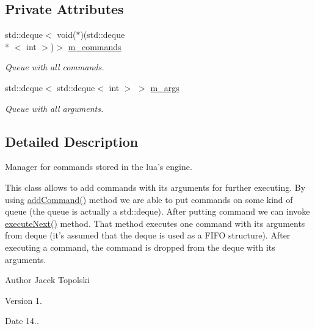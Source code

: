 \subsection*{Private Attributes}
\begin{DoxyCompactItemize}
\item 
std\-::deque$<$ void($\ast$)(std\-::deque\\*
$<$ int $>$)$>$ \hyperlink{class_commands_manager_a99e904afc8d341f390efbd2c933c3321}{m\-\_\-commands}
\begin{DoxyCompactList}\small\item\em Queue with all commands. \end{DoxyCompactList}\item 
std\-::deque$<$ std\-::deque$<$ int $>$ $>$ \hyperlink{class_commands_manager_a47bce7001c94f824eb8b9acdccd7b1d5}{m\-\_\-args}
\begin{DoxyCompactList}\small\item\em Queue with all arguments. \end{DoxyCompactList}\end{DoxyCompactItemize}


\subsection{Detailed Description}
Manager for commands stored in the lua's engine. 

This class allows to add commands with its arguments for further executing. By using \hyperlink{class_commands_manager_a1044e5df37dbb2b174dc9bc6a894d833}{add\-Command()} method we are able to put commands on some kind of queue (the queue is actually a std\-::deque). After putting command we can invoke \hyperlink{class_commands_manager_a6de7776ecdf30cb6cf09d11213c0dd29}{execute\-Next()} method. That method executes one command with its arguments from deque (it's assumed that the deque is used as a F\-I\-F\-O structure). After executing a command, the command is dropped from the deque with its arguments. \begin{DoxyAuthor}{Author}
Jacek Topolski 
\end{DoxyAuthor}
\begin{DoxyVersion}{Version}
1. 
\end{DoxyVersion}
\begin{DoxyDate}{Date}
14.. 
\end{DoxyDate}


